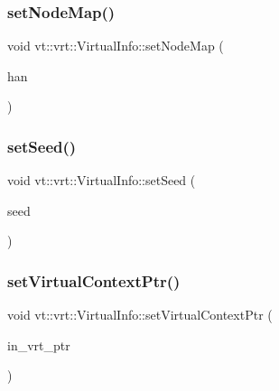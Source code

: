 \mbox{\label{structvt_1_1vrt_1_1_virtual_info_acb0b673b07b17b8eb83a91168e6c5658}} 
\subsubsection{\texorpdfstring{set\+Node\+Map()}{setNodeMap()}}
{\footnotesize\ttfamily void vt\+::vrt\+::\+Virtual\+Info\+::set\+Node\+Map (\begin{DoxyParamCaption}\item[{\hyperlink{namespacevt_af64846b57dfcaf104da3ef6967917573}{Handler\+Type} const}]{han }\end{DoxyParamCaption})\hspace{0.3cm}{\ttfamily [inline]}}

\mbox{\label{structvt_1_1vrt_1_1_virtual_info_a5c90fa0c4f42e6e80552a66403137d3f}} 
\subsubsection{\texorpdfstring{set\+Seed()}{setSeed()}}
{\footnotesize\ttfamily void vt\+::vrt\+::\+Virtual\+Info\+::set\+Seed (\begin{DoxyParamCaption}\item[{\hyperlink{namespacevt_ae2e13198bdef4d5b8e603d6c1c7f0969}{Seed\+Type} const}]{seed }\end{DoxyParamCaption})\hspace{0.3cm}{\ttfamily [inline]}}

\mbox{\label{structvt_1_1vrt_1_1_virtual_info_ab36ad072148fb10cb3c2c441488bf73d}} 
\subsubsection{\texorpdfstring{set\+Virtual\+Context\+Ptr()}{setVirtualContextPtr()}}
{\footnotesize\ttfamily void vt\+::vrt\+::\+Virtual\+Info\+::set\+Virtual\+Context\+Ptr (\begin{DoxyParamCaption}\item[{\hyperlink{structvt_1_1vrt_1_1_virtual_info_aede28e76785423dd2685fe4cf54afa21}{Virtual\+Ptr\+Type}}]{in\+\_\+vrt\+\_\+ptr }\end{DoxyParamCaption})}


